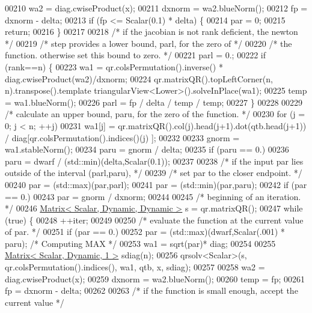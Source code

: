 \begin{DoxyCode}
00210     wa2 = diag.cwiseProduct(x);
00211     dxnorm = wa2.blueNorm();
00212     fp = dxnorm - delta;
00213     \textcolor{keywordflow}{if} (fp <= Scalar(0.1) * delta) \{
00214         par = 0;
00215         \textcolor{keywordflow}{return};
00216     \}
00217 
00218     \textcolor{comment}{/* if the jacobian is not rank deficient, the newton */}
00219     \textcolor{comment}{/* step provides a lower bound, parl, for the zero of */}
00220     \textcolor{comment}{/* the function. otherwise set this bound to zero. */}
00221     parl = 0.;
00222     \textcolor{keywordflow}{if} (rank==n) \{
00223         wa1 = qr.colsPermutation().inverse() *  diag.cwiseProduct(wa2)/dxnorm;
00224         qr.matrixQR().topLeftCorner(n, n).transpose().template triangularView<Lower>().solveInPlace(wa1);
00225         temp = wa1.blueNorm();
00226         parl = fp / delta / temp / temp;
00227     \}
00228 
00229     \textcolor{comment}{/* calculate an upper bound, paru, for the zero of the function. */}
00230     \textcolor{keywordflow}{for} (j = 0; j < n; ++j)
00231         wa1[j] = qr.matrixQR().col(j).head(j+1).dot(qtb.head(j+1)) / diag[qr.colsPermutation().indices()(j)
      ];
00232 
00233     gnorm = wa1.stableNorm();
00234     paru = gnorm / delta;
00235     \textcolor{keywordflow}{if} (paru == 0.)
00236         paru = dwarf / (std::min)(delta,Scalar(0.1));
00237 
00238     \textcolor{comment}{/* if the input par lies outside of the interval (parl,paru), */}
00239     \textcolor{comment}{/* set par to the closer endpoint. */}
00240     par = (std::max)(par,parl);
00241     par = (std::min)(par,paru);
00242     \textcolor{keywordflow}{if} (par == 0.)
00243         par = gnorm / dxnorm;
00244 
00245     \textcolor{comment}{/* beginning of an iteration. */}
00246     \hyperlink{group___core___module}{Matrix< Scalar, Dynamic, Dynamic >} s = qr.matrixQR();
00247     \textcolor{keywordflow}{while} (\textcolor{keyword}{true}) \{
00248         ++iter;
00249 
00250         \textcolor{comment}{/* evaluate the function at the current value of par. */}
00251         \textcolor{keywordflow}{if} (par == 0.)
00252             par = (std::max)(dwarf,Scalar(.001) * paru); \textcolor{comment}{/* Computing MAX */}
00253         wa1 = sqrt(par)* diag;
00254 
00255         \hyperlink{group___core___module}{Matrix< Scalar, Dynamic, 1 >} sdiag(n);
00256         qrsolv<Scalar>(s, qr.colsPermutation().indices(), wa1, qtb, x, sdiag);
00257 
00258         wa2 = diag.cwiseProduct(x);
00259         dxnorm = wa2.blueNorm();
00260         temp = fp;
00261         fp = dxnorm - delta;
00262 
00263         \textcolor{comment}{/* if the function is small enough, accept the current value */}

\end{DoxyCode}

